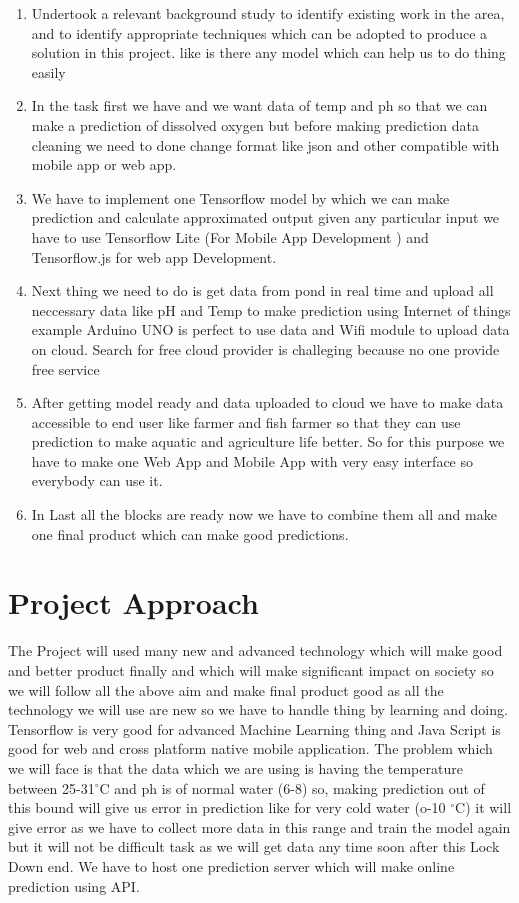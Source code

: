 \begin{enumerate}
\item	Undertook a relevant background study to identify existing work in the area, and to identify appropriate techniques which can be adopted to produce a solution in this project. like is there any model which can help us to do thing easily 
\item	In the task first we have and we want data of temp and ph so that we can make a prediction of dissolved oxygen but before making prediction data cleaning we need to done change format like json and other compatible with mobile app or web app.
\item	We have to implement one Tensorflow model by which we can make prediction and calculate approximated output given any particular input we have to use Tensorflow Lite (For Mobile App Development ) and Tensorflow.js for web app Development.
\item	Next thing we need to do is get data from pond in real time and upload all neccessary data like pH and Temp to make prediction using Internet of things example Arduino UNO is perfect to use data and Wifi module to upload data on cloud. Search for free cloud provider is challeging because no one provide free service
\item	After getting model ready and data uploaded to cloud we have to make data accessible to end user like farmer and fish farmer so that they can use prediction to make aquatic and agriculture life better. So for this purpose we have to make one Web App and Mobile App with very easy interface so everybody can use it.
\item	In Last all the blocks are ready now we have to combine them all and make one final product which can make good predictions.
\end{enumerate}


\section{Project Approach}

The Project will used many new and advanced technology which will make good and better product finally and which will make significant impact on society so we will follow all the above aim and make final product good as all the technology we will use are new so we have to handle thing by learning and doing. Tensorflow is very good for advanced Machine Learning thing and Java Script is good for web and cross platform native mobile application. The problem which we will face is that the data which we are using is having the temperature between 25-31$^{\circ}$C and ph is of normal water (6-8) so, making prediction out of this bound will give us error in prediction like for very cold water (o-10 $^{\circ}$C) it will give error as we have to collect more data in this range and train the model again but it will not be difficult task as we will get data any time soon after this Lock Down end. We have to host one prediction server which will make online prediction using API. 

